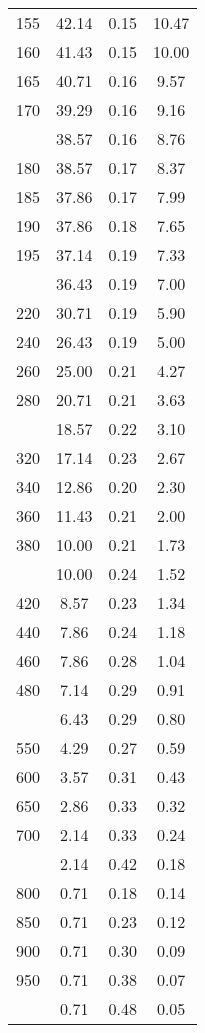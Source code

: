 \begin{table}[ht]
\begin{tabular}{lccc}
  155 & 42.14 & 0.15 & 10.47 \\ 
  160 & 41.43 & 0.15 & 10.00 \\ 
  165 & 40.71 & 0.16 & 9.57 \\ 
  170 & 39.29 & 0.16 & 9.16 \\ 
   \addlinespace
175 & 38.57 & 0.16 & 8.76 \\ 
  180 & 38.57 & 0.17 & 8.37 \\ 
  185 & 37.86 & 0.17 & 7.99 \\ 
  190 & 37.86 & 0.18 & 7.65 \\ 
  195 & 37.14 & 0.19 & 7.33 \\ 
   \addlinespace
200 & 36.43 & 0.19 & 7.00 \\ 
  220 & 30.71 & 0.19 & 5.90 \\ 
  240 & 26.43 & 0.19 & 5.00 \\ 
  260 & 25.00 & 0.21 & 4.27 \\ 
  280 & 20.71 & 0.21 & 3.63 \\ 
   \addlinespace
300 & 18.57 & 0.22 & 3.10 \\ 
  320 & 17.14 & 0.23 & 2.67 \\ 
  340 & 12.86 & 0.20 & 2.30 \\ 
  360 & 11.43 & 0.21 & 2.00 \\ 
  380 & 10.00 & 0.21 & 1.73 \\ 
   \addlinespace
400 & 10.00 & 0.24 & 1.52 \\ 
  420 & 8.57 & 0.23 & 1.34 \\ 
  440 & 7.86 & 0.24 & 1.18 \\ 
  460 & 7.86 & 0.28 & 1.04 \\ 
  480 & 7.14 & 0.29 & 0.91 \\ 
   \addlinespace
500 & 6.43 & 0.29 & 0.80 \\ 
  550 & 4.29 & 0.27 & 0.59 \\ 
  600 & 3.57 & 0.31 & 0.43 \\ 
  650 & 2.86 & 0.33 & 0.32 \\ 
  700 & 2.14 & 0.33 & 0.24 \\ 
   \addlinespace
750 & 2.14 & 0.42 & 0.18 \\ 
  800 & 0.71 & 0.18 & 0.14 \\ 
  850 & 0.71 & 0.23 & 0.12 \\ 
  900 & 0.71 & 0.30 & 0.09 \\ 
  950 & 0.71 & 0.38 & 0.07 \\ 
   \addlinespace
1000 & 0.71 & 0.48 & 0.05 \\ 
   \bottomrule
\end{tabular}
\end{table}

